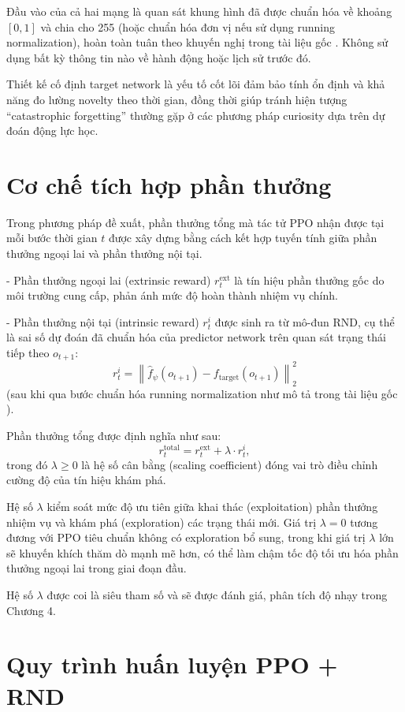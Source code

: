 \documentclass{uetgraduation}
\begin{document}
Đầu vào của cả hai mạng là quan sát khung hình đã được chuẩn hóa về khoảng $[0,1]$ và chia cho 255 (hoặc chuẩn hóa đơn vị nếu sử dụng running normalization), hoàn toàn tuân theo khuyến nghị trong tài liệu gốc \cite{burda2019}. Không sử dụng bất kỳ thông tin nào về hành động hoặc lịch sử trước đó.

Thiết kế cố định target network là yếu tố cốt lõi đảm bảo tính ổn định và khả năng đo lường novelty theo thời gian, đồng thời giúp tránh hiện tượng ``catastrophic forgetting'' thường gặp ở các phương pháp curiosity dựa trên dự đoán động lực học.

\section{Cơ chế tích hợp phần thưởng}\label{sec:reward-integration}

Trong phương pháp đề xuất, phần thưởng tổng mà tác tử PPO nhận được tại mỗi bước thời gian $t$ được xây dựng bằng cách kết hợp tuyến tính giữa phần thưởng ngoại lai và phần thưởng nội tại.

- Phần thưởng ngoại lai (extrinsic reward) $r_t^{\text{ext}}$ là tín hiệu phần thưởng gốc do môi trường cung cấp, phản ánh mức độ hoàn thành nhiệm vụ chính.

- Phần thưởng nội tại (intrinsic reward) $r_t^i$ được sinh ra từ mô-đun RND, cụ thể là sai số dự đoán đã chuẩn hóa của predictor network trên quan sát trạng thái tiếp theo $o_{t+1}$:
\[
r_t^i = \left\| \hat{f}_{\psi}(o_{t+1}) - f_{\text{target}}(o_{t+1}) \right\|_2^2
\]
(sau khi qua bước chuẩn hóa running normalization như mô tả trong tài liệu gốc \cite{burda2019}).

Phần thưởng tổng được định nghĩa như sau:
\[
r_t^{\text{total}} = r_t^{\text{ext}} + \lambda \cdot r_t^i,
\]
trong đó $\lambda \geq 0$ là hệ số cân bằng (scaling coefficient) đóng vai trò điều chỉnh cường độ của tín hiệu khám phá.

Hệ số $\lambda$ kiểm soát mức độ ưu tiên giữa khai thác (exploitation) phần thưởng nhiệm vụ và khám phá (exploration) các trạng thái mới. Giá trị $\lambda = 0$ tương đương với PPO tiêu chuẩn không có exploration bổ sung, trong khi giá trị $\lambda$ lớn sẽ khuyến khích thăm dò mạnh mẽ hơn, có thể làm chậm tốc độ tối ưu hóa phần thưởng ngoại lai trong giai đoạn đầu.

Hệ số $\lambda$ được coi là siêu tham số và sẽ được đánh giá, phân tích độ nhạy trong Chương 4.

\section{Quy trình huấn luyện PPO + RND}\label{sec:training-procedure}
\end{document}
